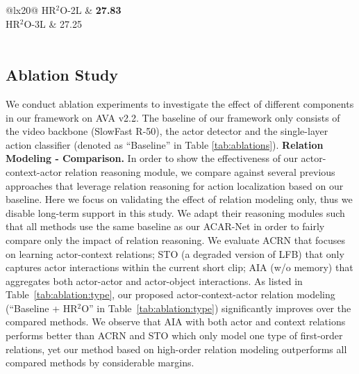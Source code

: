 \begin{table*}[!t]
{\begin{tabular}{@{}lx{20}@{}}
 {HR$^2$O-2L} & \textbf{27.83}\\
 {HR$^2$O-3L} & 27.25\\
\\
\end{tabular}}\hfill
{}

\vspace{2mm}
\caption{\textbf{Ablation study on AVA dataset}. The ``Baseline" of our framework only consists of the video backbone, actor detector and one-layer action classifier. HR$^2$O: High-order Relation Reasoning Operator. ACFB: Actor-Context Feature Bank. \label{tab:ablations}}
\vspace{-3mm}
\end{table*}



\subsection{Ablation Study}
We conduct ablation experiments to investigate the effect of different components in our framework on AVA v2.2. The baseline of our framework only consists of the video backbone (SlowFast R-50), the actor detector and the single-layer action classifier (denoted as ``Baseline'' in Table \ref{tab:ablations}).
\vspace{-3mm}
{\flushleft \bf Relation Modeling - Comparison.} In order to show the effectiveness of our actor-context-actor relation reasoning module, we compare against several previous approaches that leverage relation reasoning for action localization based on our baseline. Here we focus on validating the effect of relation modeling only, thus we disable long-term support in this study.
We adapt their reasoning modules such that all methods use the same baseline as our ACAR-Net in order to fairly compare only the impact of relation reasoning. We evaluate 
ACRN that focuses on learning actor-context relations; STO \cite{wu2019long} (a degraded version of LFB) that only captures actor interactions within the current short clip; AIA (w/o memory) \cite{tang2020asynchronous} that aggregates both actor-actor and actor-object interactions. As listed in Table~\ref{tab:ablation:type}, our proposed actor-context-actor relation modeling (``Baseline + HR$^2$O'' in Table~\ref{tab:ablation:type}) significantly improves over the compared methods. We observe that AIA with both actor and context relations performs better than ACRN and STO which only model one type of first-order relations, yet our method based on high-order relation modeling outperforms all compared methods by considerable margins. 

